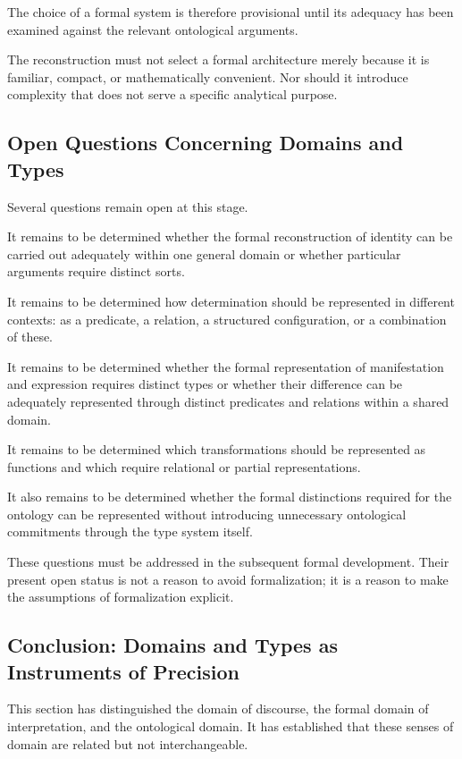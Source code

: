 The choice
of a formal
system is
therefore provisional
until its
adequacy has
been examined
against the
relevant ontological
arguments.

The reconstruction
must not select
a formal
architecture merely
because it
is familiar,
compact, or
mathematically
convenient. Nor
should it
introduce complexity
that does
not serve
a specific
analytical purpose.

\subsection{Open Questions Concerning Domains and Types}

Several questions
remain open
at this stage.

It remains
to be determined
whether the
formal reconstruction
of identity
can be carried
out adequately
within one
general domain
or whether
particular arguments
require distinct
sorts.

It remains
to be determined
how determination
should be
represented in
different contexts:
as a predicate,
a relation,
a structured
configuration,
or a combination
of these.

It remains
to be determined
whether the
formal representation
of manifestation
and expression
requires distinct
types or
whether their
difference can
be adequately
represented through
distinct predicates
and relations
within a
shared domain.

It remains
to be determined
which transformations
should be
represented as
functions and
which require
relational or
partial representations.

It also remains
to be determined
whether the
formal distinctions
required for
the ontology
can be
represented without
introducing unnecessary
ontological commitments
through the
type system itself.

These questions
must be addressed
in the subsequent
formal development.
Their present
open status
is not a
reason to
avoid formalization;
it is a
reason to
make the
assumptions of
formalization explicit.

\subsection{Conclusion: Domains and Types as Instruments of Precision}

This section
has distinguished
the domain
of discourse,
the formal
domain of
interpretation, and
the ontological
domain. It
has established
that these
senses of
domain are
related but
not interchangeable.

